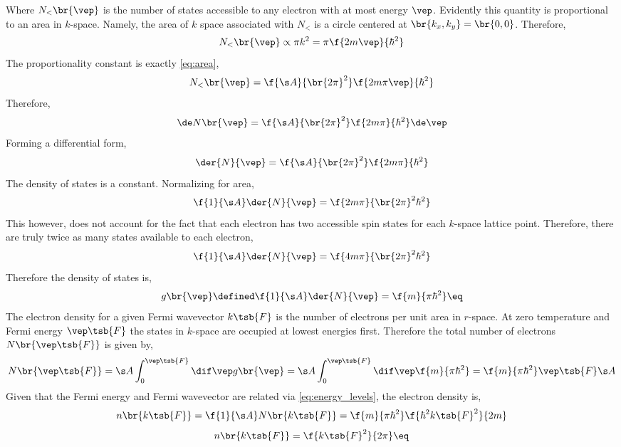 \documentclass{article}
\begin{document}
Where $N_{<}\br{\vep}$ is the number of states accessible to any electron with at most energy $\vep$. Evidently this quantity is proportional to an area in $k$-space. Namely, the area of $k$ space associated with $N_{<}$ is a circle centered at $\br{k_x, k_y} = \br{0,0}$. Therefore,
\[ N_{<}\br{\vep} \propto \pi k^2 = \pi \f{2m \vep}{\hbar^2} \]
The proportionality constant is exactly \cref{eq:area},
\[ N_{<}\br{\vep} = \f{\s A}{\br{2\pi}^2} \f{2m\pi  \vep}{\hbar^2} \]
Therefore,
\[ \de N\br{\vep} = \f{\s A}{\br{2\pi}^2} \f{2m\pi}{\hbar^2} \de \vep \]
Forming a differential form,
\[ \der{N}{\vep} = \f{\s A}{\br{2\pi}^2} \f{2m\pi}{\hbar^2} \]
The density of states is a constant. Normalizing for area,
\[ \f{1}{\s A}\der{N}{\vep} = \f{2m\pi}{\br{2\pi}^2\hbar^2} \]
This however, does not account for the fact that each electron has two accessible spin states for each $k$-space lattice point. Therefore, there are truly twice as many states available to each electron,
\[ \f{1}{\s A}\der{N}{\vep} = \f{4m\pi}{\br{2\pi}^2\hbar^2} \]
Therefore the density of states is,
\[ g\br{\vep} \defined \f{1}{\s A}\der{N}{\vep} = \f{m}{\pi \hbar^2} \eq \label{eq:2d_density_of_states} \]
The electron density for a given Fermi wavevector $k\tsb{F}$ is the number of electrons per unit area in $r$-space. At zero temperature and Fermi energy $\vep\tsb{F}$ the states in $k$-space are occupied at lowest energies first. Therefore the total number of electrons $N\br{\vep\tsb{F}}$ is given by,
\[ N\br{\vep\tsb{F}} = \s A\int_{0}^{\vep\tsb{F}} \dif \vep g\br{\vep} = \s A \int_{0}^{\vep\tsb{F}} \dif \vep \f{m}{\pi \hbar^2} = \f{m}{\pi \hbar^2} \vep\tsb{F} \s A \]
Given that the Fermi energy and Fermi wavevector are related via \cref{eq:energy_levels}, the electron density is,
\[ n\br{k\tsb{F}} = \f{1}{\s A} N\br{k\tsb{F}} = \f{m}{\pi \hbar^2} \f{\hbar^2 k\tsb{F}^2}{2m} \]
\[ n\br{k\tsb{F}} = \f{k\tsb{F}^2}{2\pi} \eq \label{eq:electron_density}\]
\end{document}
